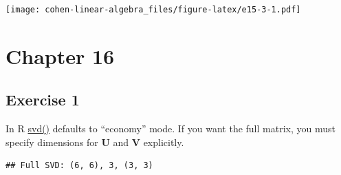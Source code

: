 \documentclass[
]{book}
\newenvironment{Shaded}{\begin{snugshade}}{\end{snugshade}}
\newcommand{\CharTok}[1]{\textcolor[rgb]{0.31,0.60,0.02}{#1}}
\newcommand{\DataTypeTok}[1]{\textcolor[rgb]{0.13,0.29,0.53}{#1}}
\newcommand{\DecValTok}[1]{\textcolor[rgb]{0.00,0.00,0.81}{#1}}
\newcommand{\KeywordTok}[1]{\textcolor[rgb]{0.13,0.29,0.53}{\textbf{#1}}}
\newcommand{\NormalTok}[1]{#1}
\newcommand{\OperatorTok}[1]{\textcolor[rgb]{0.81,0.36,0.00}{\textbf{#1}}}
\newcommand{\StringTok}[1]{\textcolor[rgb]{0.31,0.60,0.02}{#1}}
\begin{document}
\texttt{[image: cohen-linear-algebra\_files/figure-latex/e15-3-1.pdf]}

\hypertarget{chapter-16-1}{%
\section*{Chapter 16}\label{chapter-16-1}}

\hypertarget{exercise-1-10}{%
\subsection*{Exercise 1}\label{exercise-1-10}}

In R \href{https://stat.ethz.ch/R-manual/R-patched/library/base/html/svd.html}{svd()} defaults to ``economy'' mode. If you want the full matrix, you must specify dimensions for \textbf{U} and \textbf{V} explicitly.

\begin{Shaded}
\end{Shaded}

\begin{verbatim}
## Full SVD: (6, 6), 3, (3, 3)
\end{verbatim}
\end{document}
